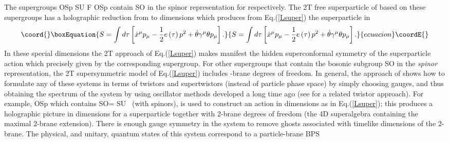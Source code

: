 \documentclass[a4paper,12pt]{article}
\begin{document}
The supergroups OSp\coordHE{} SU\coordHE{}
F\myHighlight{$\left( 4\right) ,$}\coordHE{} OSp\coordHE{} contain SO\coordHE{} in the spinor representation for \coordHE{}
respectively. The 2T free superparticle of \cite{super2t} based on
these supergroups has a holographic reduction from \coordHE{} to \coordHE{}
dimensions which produces from Eq.(\ref{Lsuper}) the
superparticle in \coordHE{}
\begin{equation}\coord{}\boxEquation{
S=\int d\tau \left[ \dot{x}^{\mu }p_{\mu }-\frac{1}{2}e\left( \tau \right)
p^{2}+\dot{\theta}\gamma ^{\mu }\theta p_{\mu }\right] .
}{
S=\int d\tau \left[ \dot{x}^{\mu }p_{\mu }-\frac{1}{2}e\left( \tau \right)
p^{2}+\dot{\theta}\gamma ^{\mu }\theta p_{\mu }\right] .
}{ecuacion}\coordE{}\end{equation}
In these special dimensions the 2T approach of Eq.(\ref{Lsuper})
makes manifest the hidden superconformal symmetry of the
superparticle action which precisely given by the corresponding
supergroup. For other supergroups that contain the bosonic
subgroup SO\coordHE{} in the \textit{ spinor
}representation, the 2T supersymmetric model of Eq.(\ref{Lsuper})
includes \coordHE{}-brane degrees of freedom. In general, the approach of
\cite {super2t} shows how to formulate any of these systems in
terms of twistors and supertwistors (instead of particle phase
space) by simply choosing gauges, and thus obtaining the spectrum
of the system by using oscillator methods developed a long time
ago \cite{barsgunaydin} (see \cite{lukierski} for a related
twistor approach). For example, OSp\coordHE{} which
contains SO\coordHE{}= SU\coordHE{} \ (with
\coordHE{} spinors), is used to construct an action
in \coordHE{} dimensions as in Eq.(\ref{Lsuper}); this produces a
holographic picture in \coordHE{} dimensions for a superparticle
together with 2-brane degrees of freedom (the 4D superalgebra
containing the maximal 2-brane extension). There is enough gauge
symmetry in the system to remove ghosts associated with timelike
dimensions of the 2-brane. The physical, and unitary, quantum
states of this system correspond to a particle-brane BPS
\end{document}
